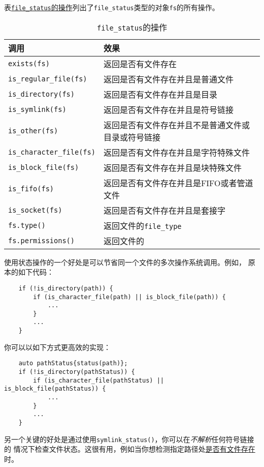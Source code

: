 表\hyperref[t20.13]{\texttt{file\_status}的操作}列出了\texttt{file\_status}类型的对象\texttt{fs}的所有操作。
\begin{table}[htb]
    \centering
    \begin{tabular}{l|l}
        \hline
        \textbf{调用}                      & \textbf{效果}               \\
        \hline
        \texttt{exists(fs)}              & 返回是否有文件存在                 \\
        \texttt{is\_regular\_file(fs)}   & 返回是否有文件存在并且是普通文件          \\
        \texttt{is\_directory(fs)}       & 返回是否有文件存在并且是目录            \\
        \texttt{is\_symlink(fs)}         & 返回是否有文件存在并且是符号链接          \\
        \texttt{is\_other(fs)}           & 返回是否有文件存在并且不是普通文件或目录或符号链接 \\
        \texttt{is\_character\_file(fs)} & 返回是否有文件存在并且是字符特殊文件        \\
        \texttt{is\_block\_file(fs)}     & 返回是否有文件存在并且是块特殊文件         \\
        \texttt{is\_fifo(fs)}            & 返回是否有文件存在并且是FIFO或者管道文件    \\
        \texttt{is\_socket(fs)}          & 返回是否有文件存在并且是套接字           \\
        \texttt{fs.type()}               & 返回文件的\texttt{file\_type}  \\
        \texttt{fs.permissions()}        & 返回文件的\nameref{ch20.4.3}   \\
        \hline
    \end{tabular}
    \caption{\texttt{file\_status}的操作}
    \label{t20.13}
\end{table}

使用状态操作的一个好处是可以节省同一个文件的多次操作系统调用。例如，
原本的如下代码：
\begin{lstlisting}
    if (!is_directory(path)) {
        if (is_character_file(path) || is_block_file(path)) {
            ...
        }
        ...
    }
\end{lstlisting}
你可以以如下方式更高效的实现：
\begin{lstlisting}
    auto pathStatus{status(path)};
    if (!is_directory(pathStatus)) {
        if (is_character_file(pathStatus) || is_block_file(pathStatus)) {
            ...
        }
        ...
    }
\end{lstlisting}
另一个关键的好处是通过使用\texttt{symlink\_status()}，你可以在\emph{不解析}任何符号链接的
情况下检查文件状态。这很有用，例如当你想检测指定路径处\hyperref[ch20.4.1.1]{是否有文件存在}时。

